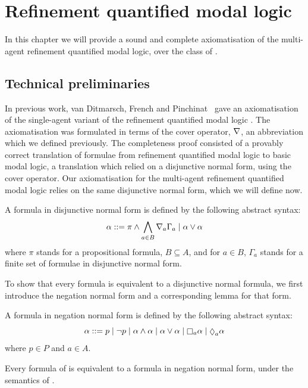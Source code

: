 \chapter{Refinement quantified modal logic}\label{k}

In this chapter we will provide a sound and complete axiomatisation of the
multi-agent refinement quantified modal logic, over the class of \classK{}. 

\section{Technical preliminaries}

In previous work, van Ditmarsch, French and Pinchinat~\cite{french2010future}
gave an axiomatisation of the single-agent variant of the refinement quantified
modal logic \logicKF{}.  The axiomatisation was formulated in terms of the cover
operator, $\nabla$, an abbreviation which we defined previously. The
completeness proof consisted of a provably correct translation of formulae from
refinement quantified modal logic to basic modal logic, a translation which
relied on a disjunctive normal form, using the cover operator. Our
axiomatisation for the multi-agent refinement quantified modal logic relies on
the same disjunctive normal form, which we will define now.

\begin{definition}
A formula in disjunctive normal form is defined by the following abstract syntax:
$$
\alpha ::= \pi \land \bigwedge_{a \in B} \nabla_a \Gamma_a \mid \alpha \lor \alpha
$$
where $\pi$ stands for a propositional formula, $B \subseteq A$, and for $a \in
B$, $\Gamma_a$ stands for a finite set of formulae in disjunctive normal form.
\end{definition}

To show that every \lang{} formula is equivalent to a disjunctive normal
formula, we first introduce the negation normal form and a corresponding lemma
for that form.

\begin{definition}
A formula in negation normal form is defined by the following abstract syntax:
$$
\alpha ::= p \bnfalt 
\neg p \bnfalt
\alpha \land \alpha \bnfalt
\alpha \lor \alpha \bnfalt
\knows_a \alpha \bnfalt
\suspects_a \alpha
$$
where $p \in P$ and $a \in A$.
\end{definition}

\begin{lemma}\label{k-nnf}
Every formula of \lang{} is equivalent to a formula in negation normal form,
under the semantics of \logicK{}.
\end{lemma}


